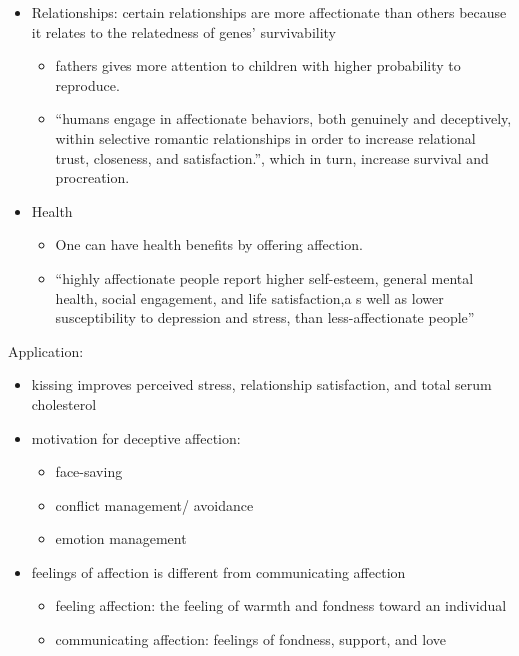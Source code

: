 \documentclass[
]{book}
\providecommand{\tightlist}{%
  \setlength{\itemsep}{0pt}\setlength{\parskip}{0pt}}
\begin{document}
\begin{itemize}
\item
  Relationships: certain relationships are more affectionate than others because it relates to the relatedness of
  genes' survivability

  \begin{itemize}
  \item
    fathers gives more attention to children with higher probability to reproduce.
  \item
    ``humans engage in affectionate behaviors, both genuinely and deceptively, within selective romantic
    relationships in order to increase relational trust, closeness, and satisfaction.'', which in turn, increase
    survival and procreation.
  \end{itemize}
\item
  Health

  \begin{itemize}
  \item
    One can have health benefits by offering affection.
  \item
    ``highly affectionate people report higher self-esteem, general mental health, social engagement, and life
    satisfaction,a s well as lower susceptibility to depression and stress, than less-affectionate
    people''\citep{Floyd_2002}
  \end{itemize}
\end{itemize}

Application:

\citep{Floyd_2009}

\begin{itemize}
\tightlist
\item
  kissing improves perceived stress, relationship satisfaction, and total serum cholesterol
\end{itemize}

\citep{Horan_2013}

\begin{itemize}
\item
  motivation for deceptive affection:

  \begin{itemize}
  \item
    face-saving
  \item
    conflict management/ avoidance
  \item
    emotion management
  \end{itemize}
\item
  feelings of affection is different from communicating affection

  \begin{itemize}
  \item
    feeling affection: the feeling of warmth and fondness toward an individual
  \item
    communicating affection: feelings of fondness, support, and love
  \end{itemize}
\end{itemize}
\end{document}
